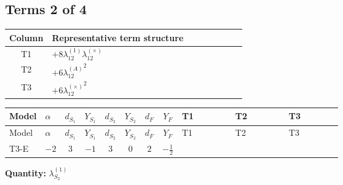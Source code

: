 \documentclass[8pt]{article}
\begin{document}
\begin{landscape}
\subsection*{Terms 2 of 4}
\begin{center}
\begin{tabular}{@{}c >{\raggedright\arraybackslash}p{0.82\linewidth}@{}}
\toprule
Column & Representative term structure \\
\midrule
T1 & \(\displaystyle +8 {\lambda_{12}^{(1)}} {\lambda_{12}^{(\times)}}\) \\
\midrule
T2 & \(\displaystyle +6 {\lambda_{12}^{(A)}}^2\) \\
\midrule
T3 & \(\displaystyle +6 {\lambda_{12}^{(\times)}}^2\) \\
\midrule
\bottomrule
\end{tabular}
\end{center}
\smallskip
\tiny
\begin{longtable}{@{}llcccccc >{\raggedright\arraybackslash}p{0.21\linewidth} >{\raggedright\arraybackslash}p{0.21\linewidth} >{\raggedright\arraybackslash}p{0.21\linewidth}@{}}
\toprule
Model & $\alpha$ & $d_{S_1}$ & $Y_{S_1}$ & $d_{S_2}$ & $Y_{S_2}$ & $d_F$ & $Y_F$ & T1 & T2 & T3 \\
\midrule
\endfirsthead
\toprule
Model & $\alpha$ & $d_{S_1}$ & $Y_{S_1}$ & $d_{S_2}$ & $Y_{S_2}$ & $d_F$ & $Y_F$ & T1 & T2 & T3 \\
\midrule
\endhead
T3-E & $-2$ & $3$ & $-1$ & $3$ & $0$ & $2$ & $-\frac{1}{2}$ & \scriptsize\adjustbox{max width=\linewidth}{$\begin{gathered} +8 {\lambda_{12}^{(1)}} {\lambda_{12}^{(\times)}}\end{gathered}$} & \scriptsize\adjustbox{max width=\linewidth}{$\begin{gathered} +6 {\lambda_{12}^{(A)}}^2\end{gathered}$} & \scriptsize\adjustbox{max width=\linewidth}{$\begin{gathered} +6 {\lambda_{12}^{(\times)}}^2\end{gathered}$} \\
\midrule
\bottomrule
\end{longtable}
\clearpage
\noindent\textbf{Quantity: }$\lambda_{S_2}^{(1)}$\par\smallskip

\end{landscape}
\end{document}
